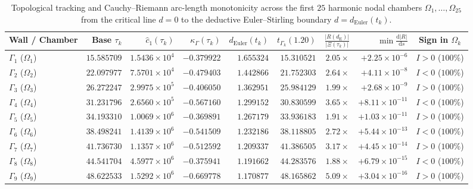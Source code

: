 \documentclass[11pt,a4paper,reqno]{amsart}
\theoremstyle{definition}
\theoremstyle{remark}
\numberwithin{equation}{section}
\newcommand{\dd}{\mathrm{d}}
\begin{document}
\begin{table}[htbp]
\centering
\caption{Topological tracking and Cauchy--Riemann arc-length monotonicity across the first $25$ harmonic nodal chambers $\Omega_1, \dots, \Omega_{25}$ from the critical line $d = 0$ to the deductive Euler--Stirling boundary $d = d_{\mathrm{Euler}}(t_k)$.}\label{tab:chambers_25}
\scriptsize
\setlength{\tabcolsep}{2.4pt}
\begin{tabular}{lrrrrrrrc}
\toprule
\textbf{Wall / Chamber} & \textbf{Base $\tau_k$} & \textbf{$\widehat{c}_1(\tau_k)$} & \textbf{$\kappa_\Gamma(\tau_k)$} & \textbf{$d_{\mathrm{Euler}}(t_k)$} & \textbf{$t_{\Gamma_k}(1.20)$} & \textbf{$\frac{|R(d_{\mathrm{E}})|}{|\Xi(\tau_k)|}$} & \textbf{$\min \frac{\dd|R|}{\dd s}$} & \textbf{Sign in $\Omega_k$} \\
\midrule
$\Gamma_1$ ($\Omega_1$)   & $15.585709$ & $1.5436 \times 10^4$ & $-0.379922$ & $1.655324$ & $15.310521$ & $2.05\times$ & $+2.25 \times 10^{-6}$  & $I > 0$ ($100\%$) \\
$\Gamma_2$ ($\Omega_2$)   & $22.097977$ & $7.5701 \times 10^4$ & $-0.479403$ & $1.442866$ & $21.752303$ & $2.64\times$ & $+4.11 \times 10^{-8}$  & $I < 0$ ($100\%$) \\
$\Gamma_3$ ($\Omega_3$)   & $26.272247$ & $2.9975 \times 10^5$ & $-0.406050$ & $1.362951$ & $25.984129$ & $1.99\times$ & $+2.68 \times 10^{-9}$  & $I > 0$ ($100\%$) \\
$\Gamma_4$ ($\Omega_4$)   & $31.231796$ & $2.6560 \times 10^5$ & $-0.567160$ & $1.299152$ & $30.830599$ & $3.65\times$ & $+8.11 \times 10^{-11}$ & $I < 0$ ($100\%$) \\
$\Gamma_5$ ($\Omega_5$)   & $34.193310$ & $1.0069 \times 10^6$ & $-0.369891$ & $1.267179$ & $33.936183$ & $1.91\times$ & $+1.03 \times 10^{-11}$ & $I > 0$ ($100\%$) \\
$\Gamma_6$ ($\Omega_6$)   & $38.498241$ & $1.4139 \times 10^6$ & $-0.541509$ & $1.232186$ & $38.118805$ & $2.72\times$ & $+5.44 \times 10^{-13}$ & $I < 0$ ($100\%$) \\
$\Gamma_7$ ($\Omega_7$)   & $41.736730$ & $1.1357 \times 10^6$ & $-0.512592$ & $1.209337$ & $41.386505$ & $3.17\times$ & $+4.45 \times 10^{-14}$ & $I > 0$ ($100\%$) \\
$\Gamma_8$ ($\Omega_8$)   & $44.541704$ & $4.5977 \times 10^6$ & $-0.375941$ & $1.191662$ & $44.283576$ & $1.88\times$ & $+6.79 \times 10^{-15}$ & $I < 0$ ($100\%$) \\
$\Gamma_9$ ($\Omega_9$)   & $48.622533$ & $1.5292 \times 10^6$ & $-0.669778$ & $1.170877$ & $48.165862$ & $5.09\times$ & $+3.04 \times 10^{-16}$ & $I > 0$ ($100\%$) \\

\end{tabular}
\end{table}
\end{document}
